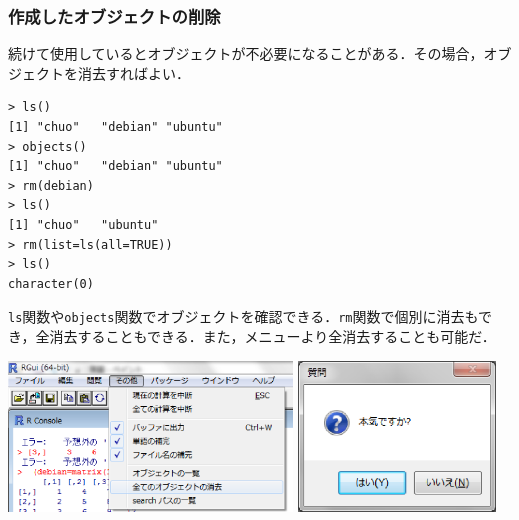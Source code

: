 \documentclass[a4paper,10pt,fleqn]{jarticle}
\begin{document}
\subsubsection{作成したオブジェクトの削除}
続けて使用しているとオブジェクトが不必要になることがある．その場合，オブジェクトを消去すればよい．
\begin{breakbox}
\begin{verbatim}
> ls()
[1] "chuo"   "debian" "ubuntu"
> objects()
[1] "chuo"   "debian" "ubuntu"
> rm(debian)
> ls()
[1] "chuo"   "ubuntu"
> rm(list=ls(all=TRUE))
> ls()
character(0)
\end{verbatim}
\end{breakbox}
{\tt ls}関数や{\tt objects}関数でオブジェクトを確認できる．{\tt rm}関数で個別に消去もでき，全消去することもできる．また，メニューより全消去することも可能だ．

\includegraphics[height=4cm]{img/windows/rmall.eps}\hspace{0.8em} \includegraphics[height=4cm]{img/windows/honki.eps}
\end{document}
